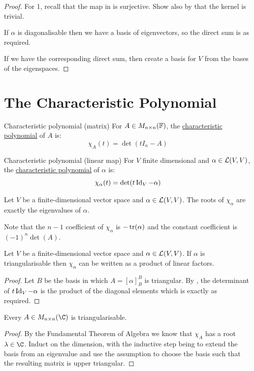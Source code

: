\documentclass[../Main.tex]{subfiles}
\begin{document}
\begin{proof}
    For 1, recall that the map in  is surjective. Show also by  that the kernel is trivial.

    If $\alpha$ is diagonalisable then we have a basis of eigenvectors, so the direct sum is as required.

    If we have the corresponding direct sum, then create a basis for $V$ from the bases of the eigenspaces.
\end{proof}
\section{The Characteristic Polynomial}
\begin{definition}{Characteristic polynomial (matrix)}
    For $A \in M_{n \times n}(\mathbb{F})$, the \underline{characteristic polynomial} of $A$ is:
    \begin{equation*}
        \chi_A(t) = \det(tI_n - A)
    \end{equation*}
\end{definition}
\begin{definition}{Characteristic polynomial (linear map)}
    For $V$ finite dimensional and $\alpha \in \mathcal{L}(V, V)$, the \underline{characteristic polynomial} of $\alpha$ is:
    \begin{equation*}
        \chi_\alpha(t) = \det(t \operatorname{Id}_V - \alpha)
    \end{equation*}
\end{definition}
\begin{lemma}
    Let $V$ be a finite-dimensional vector space and $\alpha \in \mathcal{L}(V, V)$. The roots of $\chi_\alpha$ are exactly the eigenvalues of $\alpha$.
    \label{lemRootsOfCharPoly}
\end{lemma}
Note that the $n-1$ coefficient of $\chi_\alpha$ is $-\operatorname{tr}(\alpha)$ and the constant coefficient is $(-1)^n \det(A)$.

\begin{proposition}
    Let $V$ be a finite-dimensional vector space and $\alpha \in \mathcal{L}(V, V)$. If $\alpha$ is triangularisable then $\chi_\alpha$ can be written as a product of linear factors.
    \label{propTriangularProdFactors}
\end{proposition}
\begin{proof}
    Let $B$ be the basis in which $A = [\alpha]_B^B$ is triangular. By , the determinant of $t\operatorname{Id}_V - \alpha$ is the product of the diagonal elements which is exactly as required.
\end{proof}
\begin{theorem}
    Every $A \in M_{n \times n}(\C)$ is triangularisable.
    \label{thmEveryComplexTriangular}
\end{theorem}
\begin{proof}
    By the Fundamental Theorem of Algebra we know that $\chi_A$ has a root $\lambda \in \C$. Induct on the dimension, with the inductive step being to extend the basis from an eigenvalue and use the assumption to choose the basis such that the resulting matrix is upper triangular.
\end{proof}
\end{document}

